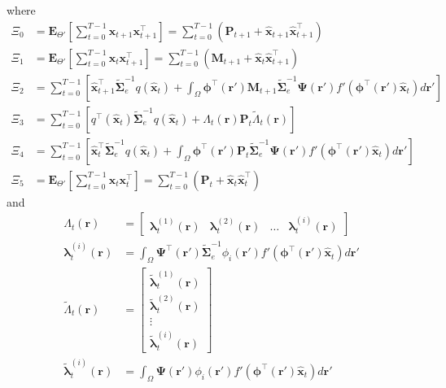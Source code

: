 \documentclass[]{article}
\begin{document}
where 
\begin{align}
	\Xi_{0}&=\mathbf E_{\Theta'}\left[\sum_{t=0}^{T-1}\mathbf x_{t+1}\mathbf x_{t+1}^\top\right]=\sum_{t=0}^{T-1}\left(\mathbf P_{t+1}+\mathbf{\hat x}_{t+1}\mathbf{\hat x}_{t+1}^\top\right)\label{eq:def of Xi'0} \\
\Xi_{1}&=\mathbf E_{\Theta'}\left[\sum_{t=0}^{T-1}\mathbf x_t\mathbf x_{t+1}^\top\right]=\sum_{t=0}^{T-1}\left(\mathbf M_{t+1}+\mathbf{\hat x}_t\mathbf{\hat x}_{t+1}^\top\right) \\
\Xi_{2}&=\sum_{t=0}^{T-1}\left[ \mathbf{\hat x}_{t+1}^\top\tilde{\boldsymbol\Sigma}_e^{-1}q(\mathbf{\hat x}_t)+\int_\Omega\boldsymbol \phi^\top(\mathbf r') \mathbf M_{t+1} \tilde{\boldsymbol\Sigma}_e^{-1} \boldsymbol{\Psi}(\mathbf{r}') f'(\boldsymbol \phi^\top(\mathbf r')\mathbf {\hat x}_t) d\mathbf{r}'\right] \\	
\Xi_{3}&=\sum_{t=0}^{T-1}\left[q^\top(\mathbf{\hat x}_t)\tilde{\boldsymbol\Sigma}_e^{-1}q(\mathbf{\hat x}_t)+\Lambda_t(\mathbf r)\mathbf P_t \tilde{\Lambda}_t(\mathbf r)\right] \\
 \Xi_{4}&=\sum_{t=0}^{T-1}\left[ \mathbf{\hat x}_{t}^\top\tilde{\boldsymbol\Sigma}_e^{-1}q(\mathbf{\hat x}_t)+\int_\Omega\boldsymbol \phi^\top(\mathbf r') \mathbf P_t \tilde{\boldsymbol\Sigma}_e^{-1}  \boldsymbol{\Psi}(\mathbf{r}') f'(\boldsymbol \phi^\top(\mathbf r')\mathbf {\hat x}_t) d\mathbf{r}'\right] \\
 \Xi_{5}&=\mathbf E_{\Theta'}\left[\sum_{t=0}^{T-1}\mathbf x_t\mathbf x_{t}^\top\right]=\sum_{t=0}^{T-1}\left(\mathbf P_t+\mathbf{\hat x}_t\mathbf{\hat x}_t^\top\right)
\end{align}
and
\begin{align}
	 \Lambda_t(\mathbf r)&=\begin{bmatrix}\boldsymbol \lambda_t^{(1)}(\mathbf r) & \boldsymbol \lambda_t^{(2)}(\mathbf r)& \dots &\boldsymbol \lambda_t^{(i)}(\mathbf r)\end{bmatrix} \\
	 \boldsymbol\lambda_t^{(i)}(\mathbf r)&=\int_{\Omega} \boldsymbol \Psi^\top(\mathbf r')\tilde{\boldsymbol\Sigma}_e^{-1}\phi_i(\mathbf r')f'(\boldsymbol\phi^\top(\mathbf r')\mathbf {\hat x}_t)d\mathbf r'\\
	\tilde{\Lambda}_t(\mathbf r)&=\begin{bmatrix}\tilde{\boldsymbol \lambda}_t^{(1)}(\mathbf r) \\ \tilde{\boldsymbol \lambda}_t^{(2)}(\mathbf r) \\ \vdots \\ \tilde{\boldsymbol \lambda}_t^{(i)}(\mathbf r)\end{bmatrix} \\
	 \tilde{\boldsymbol \lambda}_t^{(i)}(\mathbf r)&=\int_{\Omega} \boldsymbol \Psi(\mathbf r')\phi_i(\mathbf r')f'(\boldsymbol\phi^\top(\mathbf r')\mathbf {\hat x}_t)d\mathbf r'
\end{align}
\end{document}
